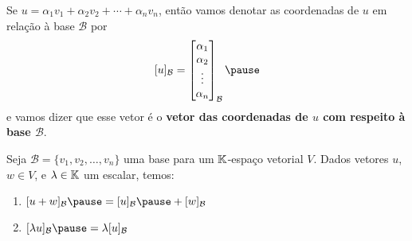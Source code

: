 \documentclass{beamer}
\begin{document}
\begin{frame}
  \begin{notacao}
    Se $u = \alpha_1v_1 + \alpha_2v_2 + \cdots + \alpha_nv_n$, \pause então vamos denotar as coordenadas de $u$ \pause em relação à base $\mathcal{B}$ por\pause
    \[
      [u]_\mathcal{B} = \begin{bmatrix}\alpha_1\\\alpha_2\\ \vdots\\ \alpha_n\end{bmatrix}_\mathcal{B}\pause
    \]
    e vamos dizer que esse vetor \pause é o \textbf{vetor das coordenadas de $u$ com respeito à base $\mathcal{B}$}.
  \end{notacao}
\end{frame}

\begin{frame}
  \begin{teorema}
    Seja $\mathcal{B} = \{v_1, v_2, \dots, v_n\}$ uma base \pause para um $\mathbb{K}$-espaço vetorial $V$. \pause Dados vetores $u$, $w \in V$, \pause e $\lambda \in \mathbb{K}$ um escalar, temos: \pause
    \begin{enumerate}[label={\roman*})]
      \vspace{.2cm}

      \item $[u + w]_\mathcal{B} \pause = [u]_\mathcal{B} \pause + [w]_\mathcal{B}$ \pause

      \vspace{1cm}

      \item $[\lambda u]_\mathcal{B} \pause = \lambda[u]_\mathcal{B}$
    \end{enumerate}
  \end{teorema}
\end{frame}

\end{document}

